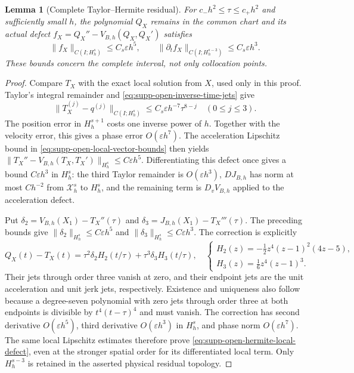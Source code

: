 \documentclass[11pt]{article}
\numberwithin{equation}{section}
\newtheorem{lemma}[lemma]{Lemma}
\theoremstyle{definition}
\theoremstyle{remark}
\begin{document}
\begin{lemma}[Complete Taylor--Hermite residual]
\label{lem:supp-open-hermite-residual}
For $c_-h^2\le\tau\le c_+h^2$ and sufficiently small $h$, the polynomial
$Q_X$ remains in the common chart and its actual defect
$f_X=Q_X''-V_{B,h}(Q_X,Q_X')$ satisfies
\begin{equation}
 \|f_X\|_{C(I;H_h^s)}\le C_s\varepsilon h^5,
 \qquad
 \|\partial_tf_X\|_{C(I;H_h^{s-3})}\le C_s\varepsilon h^3.
 \label{eq:supp-open-hermite-local-defect}
\end{equation}
These bounds concern the complete interval, not only collocation points.
\end{lemma}
\begin{proof}
Compare $T_X$ with the exact local solution from $X$, used only in this
proof.  Taylor's integral remainder and
\eqref{eq:supp-open-inverse-time-jets} give
\begin{equation}
 \|T_X^{(j)}-q^{(j)}\|_{C(I;H_h^s)}
 \le C_s\varepsilon h^{-7}\tau^{8-j}\quad(0\le j\le3).
 \label{eq:supp-open-taylor-remainder}
\end{equation}
The position error in $H_h^{s+1}$ costs one inverse power of $h$.
Together with the velocity error, this gives a phase error
$O(\varepsilon h^7)$.  The acceleration Lipschitz bound in
\eqref{eq:supp-open-local-vector-bounds} then yields
$\|T_X''-V_{B,h}(T_X,T_X')\|_{H_h^s}\le C\varepsilon h^5$.
Differentiating this defect once gives a bound $C\varepsilon h^3$ in
$H_h^s$: the third Taylor remainder is $O(\varepsilon h^3)$,
$DJ_{B,h}$ has norm at most $Ch^{-2}$ from $\mathcal X_h^s$ to $H_h^s$,
and the remaining term is $D_vV_{B,h}$ applied to the acceleration defect.

Put $\delta_2=V_{B,h}(X_1)-T_X''(\tau)$ and
$\delta_3=J_{B,h}(X_1)-T_X'''(\tau)$.  The preceding bounds give
$\|\delta_2\|_{H_h^s}\le C\varepsilon h^5$ and
$\|\delta_3\|_{H_h^s}\le C\varepsilon h^3$.
The correction is explicitly
\begin{equation}
 Q_X(t)-T_X(t)=\tau^2\delta_2 H_2(t/\tau)
                         +\tau^3\delta_3 H_3(t/\tau),
 \quad
 \begin{cases}
 H_2(z)=-\tfrac12z^4(z-1)^2(4z-5),\\
 H_3(z)=\tfrac16z^4(z-1)^3.
 \end{cases}
 \label{eq:supp-open-hermite-correction}
\end{equation}
Their jets through order three vanish at zero, and their endpoint jets
are the unit acceleration and unit jerk jets, respectively.  Existence
and uniqueness also follow because a degree-seven polynomial with zero
jets through order three at both endpoints is divisible by
$t^4(t-\tau)^4$ and must vanish.
The correction has second derivative $O(\varepsilon h^5)$, third
derivative $O(\varepsilon h^3)$ in $H_h^s$, and phase norm
$O(\varepsilon h^7)$.  The same local Lipschitz estimates therefore prove
\eqref{eq:supp-open-hermite-local-defect}, even at the stronger spatial
order for its differentiated local term.  Only $H_h^{s-3}$ is retained in
the asserted physical residual topology.
\end{proof}
\end{document}
